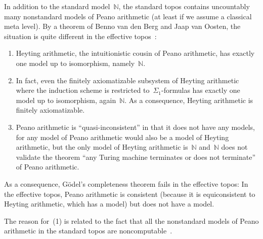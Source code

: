 \documentclass[oneside,reqno]{amsart}
\theoremstyle{definition}
\theoremstyle{plain}
\theoremstyle{remark}
\newcommand{\NN}{\mathbb{N}}
\renewcommand{\_}{\mathpunct{.}\,}
\newcommand{\effective}{ef{}fective\xspace}
\newcommand{\?}{\,{:}\,}
\begin{document}
\bigskip
{} In addition to the standard
model~$\NN$, the standard topos contains uncountably many nonstandard models of
Peano arithmetic (at least if we assume a classical meta level). By a theorem
of Benno van den Berg and Jaap van Oosten, the situation
is quite different in the \effective topos~\cite{XXX}:
\begin{enumerate}
\item Heyting arithmetic, the intuitionistic cousin of Peano arithmetic, has
exactly one model up to isomorphism, namely~$\NN$.
\item In fact, even the finitely axiomatizable subsystem of Heyting arithmetic
where the induction scheme is restricted to~$\Sigma_1$-formulas has exactly one
model up to isomorphism, again~$\NN$. As a consequence, Heyting arithmetic is
finitely axiomatizable.
\item Peano arithmetic is ``quasi-inconsistent'' in that it does not have any
models, for any model of Peano arithmetic would also be a model of Heyting
arithmetic, but the only model of Heyting arithmetic is~$\NN$ and~$\NN$ does
not validate the theorem ``any Turing machine terminates or does not
terminate'' of Peano arithmetic.
\end{enumerate}
As a consequence, Gödel's completeness theorem fails in the \effective topos:
In the \effective topos, Peano arithmetic is consistent (because it is
equiconsistent to Heyting arithmetic, which has a model) but does not have a
model.

The reason for~(1) is related to the fact that all the nonstandard models of
Peano arithmetic in the standard topos are noncomputable~\cite{XXX}.
\end{document}
